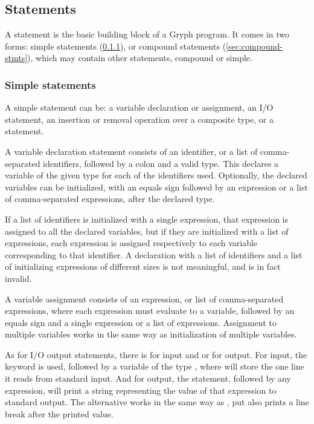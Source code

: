\subsection{Statements}
\label{sec:statements}
A statement is the basic building block of a Gryph program. It comes in two forms: simple statements (\ref{sec:simple-stmts}), or compound statements (\ref{sec:compound-stmts}), which may contain other statements, compound or simple.
\subsubsection{Simple statements}
\label{sec:simple-stmts}
A simple statement can be: a variable declaration or assignment, an I/O statement, an insertion or removal operation over a composite type, or a  statement. 

A variable declaration statement consists of an identifier, or a list of comma-separated identifiers, followed by a colon and a valid type. This declares a variable of the given type for each of the identifiers used. Optionally, the declared variables can be initialized, with an equals sign followed by an expression or a list of comma-separated expressions, after the declared type. 

If a list of identifiers is initialized with a single expression, that expression is assigned to all the declared variables, but if they are initialized with a list of expressions, each expression is assigned respectively to each variable corresponding to that identifier. A declaration with a list of identifiers and a list of initializing expressions of different sizes is not meaningful, and is in fact invalid.

A variable assignment consists of an expression, or list of comma-separated expressions, where each expression must evaluate to a variable, followed by an equals sign and a single expression or a list of expressions. Assignment to multiple variables works in the same way as initialization of multiple variables.

As for I/O output statements, there is  for input and  or  for output. For input, the  keyword is used, followed by a variable of the type , where  will store the one line it reads from standard input. And for output, the  statement, followed by any expression, will print a string representing the value of that expression to standard output. The  alternative works in the same way as , put also prints a line break after the printed value.

